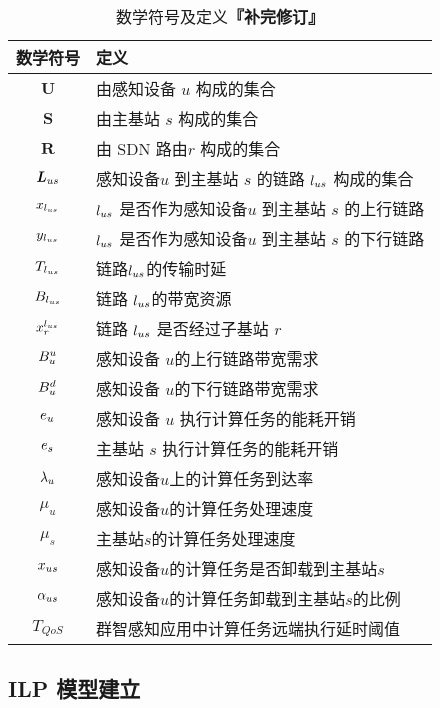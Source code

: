 \begin{table}[!h]
  \caption{数学符号及定义\textbf{『补完修订』}}
  \vspace{-1em}
  \label{table_notations_ispa}
  \centering
  \begin{tabular}{c|p{8cm}}
  \hline
  \textbf{数学符号} & \textbf{定义}\\
  \hline
  $\boldsymbol{U}$ & 由感知设备 $u$ 构成的集合\\\hline
  $\boldsymbol{S}$ & 由主基站 $s$ 构成的集合\\\hline
  $\boldsymbol{R}$ & 由 SDN 路由$r$ 构成的集合\\\hline
  $\boldsymbol{L}_{us}$ & 感知设备$u$ 到主基站 $s$ 的链路 $l_{us}$ 构成的集合\\\hline
  $x_{l_{us}}$ & $l_{us}$ 是否作为感知设备$u$ 到主基站 $s$ 的上行链路\\\hline
  $y_{l_{us}}$ & $l_{us}$ 是否作为感知设备$u$ 到主基站 $s$ 的下行链路\\\hline
  $T_{l_{us}}$ & 链路$l_{us}$的传输时延\\\hline
  $B_{l_{us}}$ & 链路 $l_{us}$的带宽资源\\\hline
  $x^{l_{us}}_{r}$ & 链路 $l_{us}$ 是否经过子基站 $r$\\\hline
  $B^{u}_u$ & 感知设备 $u$的上行链路带宽需求\\\hline
  $B^{d}_u$ & 感知设备 $u$的下行链路带宽需求\\\hline
  $e_u$ & 感知设备 $u$ 执行计算任务的能耗开销\\\hline
  $e_s$ & 主基站 $s$ 执行计算任务的能耗开销\\\hline
  ${\lambda}_{u}$ & 感知设备$u$上的计算任务到达率\\\hline
  $\mu_u$ & 感知设备$u$的计算任务处理速度\\\hline
  $\mu_s$ & 主基站$s$的计算任务处理速度\\\hline
  ${x}_{us}$ & 感知设备$u$的计算任务是否卸载到主基站$s$\\\hline
  ${\alpha}_{us}$ & 感知设备$u$的计算任务卸载到主基站$s$的比例\\\hline
  $T_{QoS}$ & 群智感知应用中计算任务远端执行延时阈值 \\\hline
  \end{tabular}
\end{table}

\subsection{ILP 模型建立}

